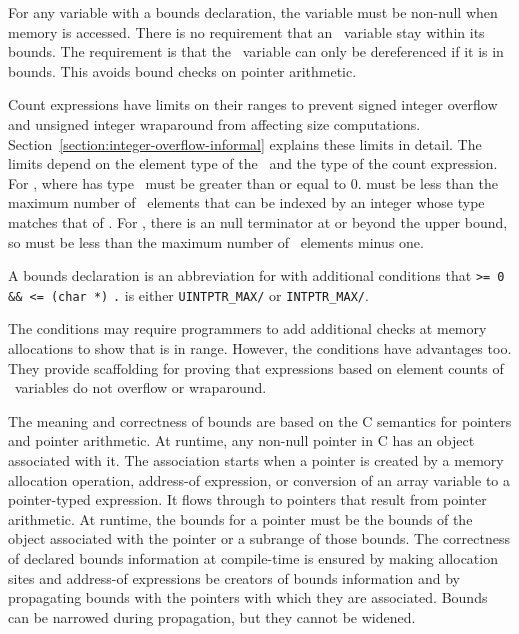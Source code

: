 For any variable with a bounds declaration, the variable must be
non-null when memory is accessed.  There is no requirement that an
\arrayptr\ variable stay within its bounds. The requirement is
that the \arrayptr\ variable can only be dereferenced if it is
in bounds. This avoids bound checks on pointer arithmetic.

Count expressions have limits on their ranges to prevent signed integer
overflow and unsigned integer wraparound from affecting size
computations. Section~\ref{section:integer-overflow-informal}
explains these limits in detail. The limits
depend on the element type of the \arrayptr\ and the type of the count
expression. For , where 
has type \arrayptrT\,
 must be greater than or equal to 0.  must be less
than the maximum number of \arrayptrT\ elements
that can be indexed by an integer whose type matches that of .
For \ntarrayptr, there is
an null terminator at or beyond the upper bound, so 
must be less than the maximum number of \arrayptrT\ elements minus one.

A bounds declaration  is an
abbreviation for  with additional conditions that 
\texttt{>= 0 \&\&  <= (char *)}
\texttt{.}  is either
\texttt{UINTPTR\_MAX/} or
\texttt{INTPTR\_MAX/}. 

The conditions may require programmers to add additional checks at memory allocations
to show that  is in range. However, the conditions have advantages too.
They provide scaffolding for proving that expressions based on
element counts of \arrayptr\ variables do not overflow or wraparound.

The meaning and correctness of bounds are based on the C semantics for
pointers and pointer arithmetic. At runtime, any non-null pointer in C
has an object associated with it. The association starts when a pointer
is created by a memory allocation operation, address-of expression, or
conversion of an array variable to a pointer-typed expression. It flows
through to pointers that result from pointer arithmetic. At runtime, the
bounds for a pointer must be the bounds of the object associated with
the pointer or a subrange of those bounds. The correctness of declared
bounds information at compile-time is ensured by making allocation sites
and address-of expressions be creators of bounds information and by
propagating bounds with the pointers with which they are associated.
Bounds can be narrowed during propagation, but they cannot be widened.

